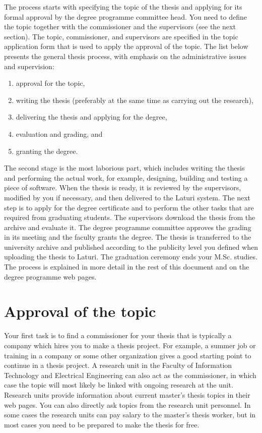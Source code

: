 The process starts with specifying the topic of the thesis and applying for its formal approval by the degree programme committee head. You need to define the topic together with the commissioner and the supervisors (see the next section). The topic, commissioner, and supervisors are specified in the topic application form that is used to apply the approval of the topic. The list below presents the general thesis process, with emphasis on the administrative issues and supervision:

\begin{enumerate}
    \setlength\itemsep{0pt}
    \setlength\parskip{0pt}
    \item approval for the topic,
    \item writing the thesis (preferably at the same time as carrying out the research),
    \item delivering the thesis and applying for the degree,
    \item evaluation and grading, and
    \item granting the degree.
\end{enumerate}

The second stage is the most laborious part, which includes writing the thesis and performing the actual work, for example, designing, building and testing a piece of software. When the thesis is ready, it is reviewed by the supervisors, modified by you if necessary, and then delivered to the Laturi system. The next step is to apply for the degree certificate and to perform the other tasks that are required from graduating students. The supervisors download the thesis from the archive and evaluate it. The degree programme committee approves the grading in its meeting and the faculty grants the degree. The thesis is transferred to the university archive and published according to the publicity level you defined when uploading the thesis to Laturi. The graduation ceremony ends your M.Sc. studies. The process is explained in more detail in the rest of this document and on the degree programme web pages\DIFaddbegin \DIFadd{~}\DIFaddend \cite{mscstudies}.

\section{Approval of the topic}

Your first task is to find a commissioner for your thesis that is typically a company which hires you to make a thesis project. For example, a summer job or training in a company or some other organization gives a good starting point to continue in a thesis project. A research unit in the Faculty of Information Technology and Electrical Engineering can also act as the commissioner, in which case the topic will most likely be linked with ongoing research at the unit. Research units provide information about current master’s thesis topics in their web pages. You can also directly ask topics from the research unit personnel. In some cases the research units can pay salary to the master’s thesis worker, but in most cases you need to be prepared to make the thesis for free.

